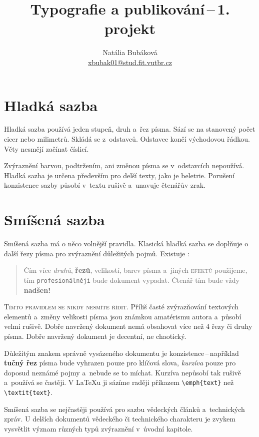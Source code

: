 \documentclass[twocolumn]{article}
\title{Typografie a publikování\,–\,1. projekt}
\author{Natália Bubáková \\ 
\href {mailto:xbubak01@stud.fit.vutbr.cz}{xbubak01@stud.fit.vutbr.cz}}
\date{}
\begin{document}
\maketitle


\section{Hladká sazba}

Hladká sazba používá jeden stupeň, druh a~řez písma.
Sází se na stanovený počet cicer nebo milimetrů.
Skládá se z~odstavců. Odstavec končí východovou řádkou.
Věty nesmějí začínat číslicí.

Zvýraznění barvou, podtržením, ani změnou písma se v~odstavcích nepoužívá.
Hladká sazba je určena především pro delší texty, jako je beletrie.
Porušení konzistence sazby působí v~textu rušivě a~unavuje čtenářův zrak.

\section{Smíšená sazba}\label{2}
Smíšená sazba má o něco volnější pravidla.
Klasická hladká sazba se doplňuje o další řezy písma pro zvýraznění důležitých pojmů.
Existuje :

\begin{quotation}
Čím více \textit{druhů}, \textbf{řezů}, {\tiny velikostí}, {\color{red} barev} písma a~jiných \textsc{efektů} použijeme, tím \texttt{profesionálněji} bude {\Large {}\selectfont dokument} vypadat.
{\huge Č}{\LARGE t}{\Large e}{\large n}á{\small ř} {\footnotesize t}{\scriptsize í}{\tiny m} bude vždy {\Huge \bfseries nadšen!}
\end{quotation}

\textsc{Tímto pravidlem se nikdy nesmíte řídit.}
Příliš časté zvýrazňování textových elementů a~změny velikosti písma jsou známkou amatérismu autora a~působí velmi rušivě.
Dobře navržený dokument nemá obsahovat více než 4 řezy či druhy písma.
Dobře navržený dokument je decentní, ne chaotický.

Důležitým znakem správně vysázeného dokumentu je konzistence\,--\,například  \textbf{tučný řez} písma bude vyhrazen pouze pro klíčová slova, \textit{kurzíva} pouze pro doposud neznámé pojmy a~nebude se to míchat.
Kurzíva nepůsobí tak rušivě a~používá se častěji.
V \LaTeX{}u ji sázíme raději příkazem \verb|\emph{text}| než \verb|\textit{text}|.

Smíšená sazba se nejčastěji používá pro sazbu vědeckých článků a~technických zpráv.
U delších dokumentů vědeckého či technického charakteru je zvykem vysvětlit význam různých typů zvýraznění v~úvodní kapitole.
\end{document}
